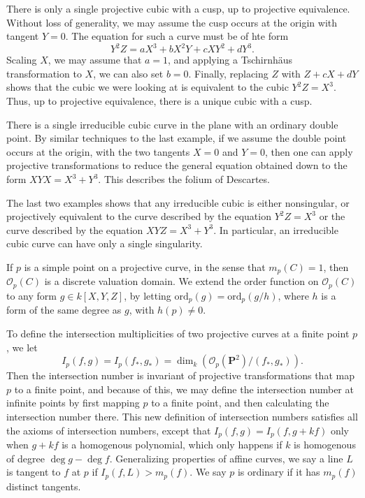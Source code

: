 \begin{example}
    There is only a single projective cubic with a cusp, up to projective equivalence. Without loss of generality, we may assume the cusp occurs at the origin with tangent $Y = 0$. The equation for such a curve must be of hte form
    \[ Y^2Z = aX^3 + bX^2Y + cXY^2 + dY^3. \]
    Scaling $X$, we may assume that $a = 1$, and applying a Tschirnh\"{a}us transformation to $X$, we can also set $b = 0$. Finally, replacing $Z$ with $Z + cX + dY$ shows that the cubic we were looking at is equivalent to the cubic $Y^2 Z = X^3$. Thus, up to projective equivalence, there is a unique cubic with a cusp.
\end{example}

\begin{example}
    There is a single irreducible cubic curve in the plane with an ordinary double point. By similar techniques to the last example, if we assume the double point occurs at the origin, with the two tangents $X = 0$ and $Y = 0$, then one can apply projective transformations to reduce the general equation obtained down to the form $XYX = X^3 + Y^3$. This describes the folium of Descartes.
\end{example}

\begin{remark}
    The last two examples shows that any irreducible cubic is either nonsingular, or projectively equivalent to the curve described by the equation $Y^2Z = X^3$ or the curve described by the equation $XYZ = X^3 + Y^3$. In particular, an irreducible cubic curve can have only a single singularity.
\end{remark}

If $p$ is a simple point on a projective curve, in the sense that $m_p(C) = 1$, then $\mathcal{O}_p(C)$ is a discrete valuation domain. We extend the order function on $\mathcal{O}_p(C)$ to any form $g \in k[X,Y,Z]$, by letting $\text{ord}_p(g) = \text{ord}_p(g/h)$, where $h$ is a form of the same degree as $g$, with $h(p) \neq 0$.

To define the intersection multiplicities of two projective curves at a finite point $p$, we let
%
\[ I_p(f,g) = I_p(f_*,g_*) = \dim_k ( \mathcal{O}_p(\mathbf{P}^2)/(f_*,g_*) ). \]
%
Then the intersection number is invariant of projective transformations that map $p$ to a finite point, and because of this, we may define the intersection number at infinite points by first mapping $p$ to a finite point, and then calculating the intersection number there. This new definition of intersection numbers satisfies all the axioms of intersection numbers, except that $I_p(f,g) = I_p(f,g + kf)$ only when $g + kf$ is a homogenous polynomial, which only happens if $k$ is homogenous of degree $\deg g - \deg f$. Generalizing properties of affine curves, we say a line $L$ is tangent to $f$ at $p$ if $I_p(f,L) > m_p(f)$. We say $p$ is ordinary if it has $m_p(f)$ distinct tangents.

